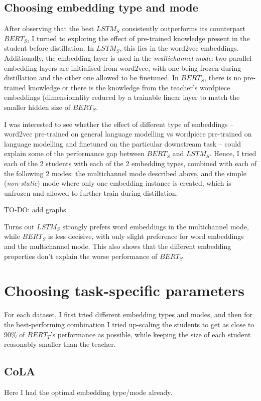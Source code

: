 \documentclass[bsc,frontabs,twoside,singlespacing,parskip,deptreport]{infthesis}
\begin{document}
{{    \subsection{Choosing embedding type and mode}{
      After observing that the best $LSTM_S$ consistently outperforms its counterpart $BERT_S$, I turned to exploring the effect of pre-trained knowledge present in the student before distillation.
      In $LSTM_S$, this lies in the word2vec embeddings. Additionally, the embedding layer is used in the \textit{multichannel mode}: two parallel embedding layers are initialised from word2vec, with one being frozen during distillation and the other one allowed to be finetuned. In $BERT_S$, there is no pre-trained knowledge or there is the knowledge from the teacher's wordpiece embeddings (dimensionality reduced by a trainable linear layer to match the smaller hidden size of $BERT_S$.

      I was interested to see whether the effect of different type of embeddings -- word2vec pre-trained on general language modelling vs wordpiece pre-trained on language modelling and finetuned on the particular downstream task -- could explain some of the performance gap between $BERT_S$ and $LSTM_S$.
      Hence, I tried each of the 2 students with each of the 2 embedding types, combined with each of the following 2 modes: the multichannel mode described above, and the simple (\textit{non-static}) mode where only one embedding instance is created, which is unfrozen and allowed to further train during distillation.

      TO-DO: add graphs

      Turns out $LSTM_S$ strongly prefers word embeddings in the multichannel mode, while $BERT_S$ is less decisive, with only slight preference for word embeddings and the multichannel mode. This also shows that the different embedding properties don't explain the worse performance of $BERT_S$.
    }
  }

  \section{Choosing task-specific parameters}{
    For each dataset, I first tried different embedding types and modes, and then for the best-performing combination I tried up-scaling the students to get as close to 90\% of $BERT_T$'s performance as possible, while keeping the size of each student reasonably smaller than the teacher.

    \subsection{CoLA}{
      Here I had the optimal embedding type/mode already.

}}}
\end{document}
